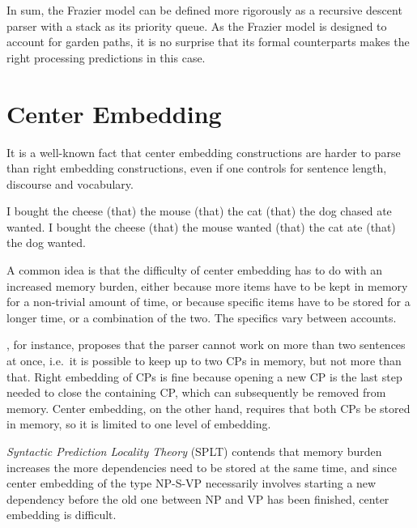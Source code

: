In sum, the Frazier model can be defined more rigorously as a recursive descent parser with a stack as its priority queue.
As the Frazier model is designed to account for garden paths, it is no surprise that its formal counterparts makes the right processing predictions in this case.

\section{Center Embedding}
\label{sub:TopDownEval_CenterEmbedding}
It is a well-known fact that center embedding constructions are harder to parse than right embedding constructions, even if one controls for sentence length, discourse and vocabulary.
%
\begin{exe}
    \ex
    \begin{xlist}
        \ex I bought the cheese (that) the mouse (that) the cat (that) the dog chased ate wanted.
        \ex I bought the cheese (that) the mouse wanted (that) the cat ate (that) the dog wanted.
    \end{xlist}
\end{exe}
%
A common idea is that the difficulty of center embedding has to do with an increased memory burden, either because more items have to be kept in memory for a non-trivial amount of time, or because specific items have to be stored for a longer time, or a combination of the two.
The specifics vary between accounts.

\citet{Kimball73}, for instance, proposes that the parser cannot work on more than two sentences at once, i.e.\ it is possible to keep up to two CPs in memory, but not more than that.
Right embedding of CPs is fine because opening a new CP is the last step needed to close the containing CP, which can subsequently be removed from memory.
Center embedding, on the other hand, requires that both CPs be stored in memory, so it is limited to one level of embedding.

 \emph{Syntactic Prediction Locality Theory} (SPLT) contends that memory burden increases the more dependencies need to be stored at the same time, and since center embedding of the type NP-S-VP necessarily involves starting a new dependency before the old one between NP and VP has been finished, center embedding is difficult.

